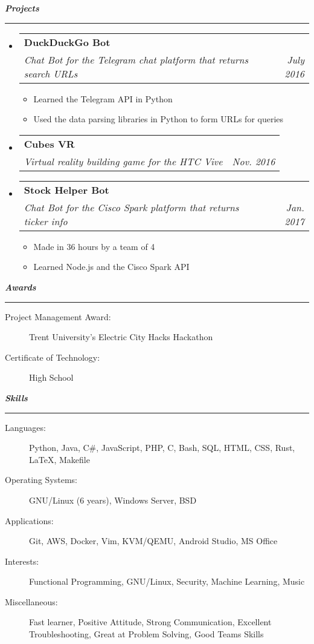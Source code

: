 \documentclass[letterpaper,11pt]{article}
\makeatletter
\newcommand{\resitem}[1]{\item #1 \vspace{-2pt}}
\newcommand{\mysection}[1]{\vspace{5pt} {\bfseries \textsl{#1}} \\ {\color{gray} \rule[5pt]{\textwidth}{1pt}}}
\newcommand{\ressubheading}[4]{\begin{tabular*}{6.5in}{l@{\extracolsep{\fill}}r}
        \textbf{#1} & #2 \\
        \textit{#3} & \textit{#4} \\
\end{tabular*}\vspace{-6pt}}
\makeatother
\begin{document}
\mysection{Projects}
\begin{itemize}
    \item
        \ressubheading{DuckDuckGo Bot}{}{Chat Bot for the Telegram chat platform that returns search URLs}{July 2016}
        \begin{itemize}
                \resitem{Learned the Telegram API in Python}
                \resitem{Used the data parsing libraries in Python to form URLs for queries}
        \end{itemize}

    \item
        \ressubheading{Cubes VR}{}{Virtual reality building game for the HTC Vive}{Nov. 2016}

    \item
        \ressubheading{Stock Helper Bot}{}{Chat Bot for the Cisco Spark platform that returns ticker info}{Jan. 2017}
        \begin{itemize}
                \resitem{Made in 36 hours by a team of 4}
                \resitem{Learned Node.js and the Cisco Spark API}
        \end{itemize}
\end{itemize}

\mysection{Awards}
\begin{description}
    \item[Project Management Award:]
        Trent University's Electric City Hacks Hackathon
    \item[Certificate of Technology:] High School
\end{description}

\mysection{Skills}
\begin{description}
    \item[Languages:]
        Python, Java, C\#, JavaScript, PHP, C, Bash, SQL, HTML, CSS, Rust, \LaTeX{}, Makefile
    \item[Operating Systems:]
        GNU/Linux (6 years), Windows Server, BSD
    \item[Applications:]
        Git, AWS, Docker, Vim, KVM/QEMU, Android Studio, MS Office
    \item[Interests:]
        Functional Programming, GNU/Linux, Security, Machine Learning, Music
    \item[Miscellaneous:]
        Fast learner, Positive Attitude, Strong Communication, Excellent Troubleshooting, Great at Problem Solving, Good Teams Skills
\end{description}
\end{document}
